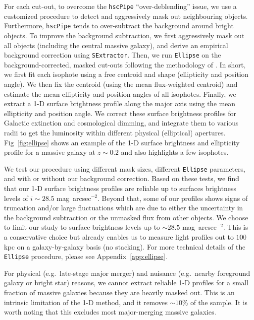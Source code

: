 \documentclass[a4paper,fleqn,usenatbib]{mnras}
\def\sb{mag~arcsec$^{-2}$}
\def\rbcg{\texttt{cenHighMh}}
\def\nbcg{\texttt{cenLowMh}}
\begin{document}
    For each cut-out, to overcome the \texttt{hscPipe} ``over-deblending'' issue, 
    we use a customized procedure to detect and aggressively mask out
    neighbouring objects. 
    Furthermore, \texttt{hscPipe} tends to over-subtract the background around 
    bright objects. 
    To improve the background subtraction, we first aggressively mask 
    out all objects (including the central massive galaxy), and derive an 
    empirical background correction using \texttt{SExtractor}.
    Then, we run \texttt{Ellipse} on the background-corrected, masked cut-outs 
    following the methodology of \citet{Li2012}. 
    In short, we first fit each isophote using a free centroid and shape 
    (ellipticity and position angle). 
    We then fix the centroid (using the mean flux-weighted centroid) and estimate
    the mean ellipticity and position angles of all isophotes. 
    Finally, we extract a 1-D surface brightness profile along the major axis using 
    the mean ellipticity and position angle. 
    We correct these surface brightness profiles for Galactic extinction and 
    cosmological dimming, and integrate them to various radii to get the luminosity 
    within different physical (elliptical) apertures. 
    Fig~\ref{fig:ellipse} shows an example of the 1-D surface brightness and 
    ellipticity profile for a massive galaxy at $z{\sim}0.2$ and also highlights 
    a few isophotes.    

    We test our procedure using different mask sizes, different \texttt{Ellipse} 
    parameters, and with or without our background correction. 
    Based on these tests, we find that our 1-D surface brightness profiles are reliable 
    up to surfaces brightness levels of $i{\sim}28.5$ \sb. 
    Beyond that, some of our profiles shows signs of truncation and/or large 
    fluctuations which are due to either the uncertainty in the background 
    subtraction or the unmasked flux from other objects.
    We choose to limit our study to surface brightness levels up to ${\sim} 28.5$ \sb. 
    This is a conservative choice but already enables us to measure light profiles 
    out to $100$ kpc on a galaxy-by-galaxy basis (no stacking). 
    For more technical details of the \texttt{Ellipse} procedure, please see 
    Appendix~\ref{app:ellipse}.

    
    For physical (e.g.\ late-stage major merger) and nuisance (e.g.\ nearby foreground 
    galaxy or bright star) reasons, we cannot extract reliable 1-D profiles for a small 
    fraction of massive galaxies because they are heavily masked out. 
    This is an intrinsic limitation of the 1-D method, and it removes ${\sim}10$\% of 
    the sample.
    It is worth noting that this excludes most major-merging massive galaxies. 
    
\end{document}
